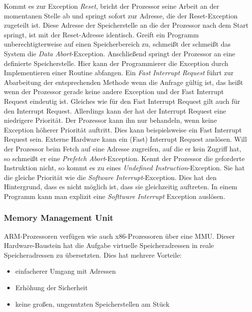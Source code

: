 Kommt es zur Exception \textit{Reset}, bricht der Prozessor seine Arbeit an der momentanen Stelle ab und springt sofort zur Adresse, die der Reset-Exception zugeteilt ist. Diese Adresse der Speicherstelle an die der Prozessor nach dem Start springt, ist mit der Reset-Adresse identisch. 
Greift ein Programm unberechtigterweise auf einen Speicherbereich zu, schmeißt der schmeißt das System die \textit{Data Abort}-Exception. Anschließend springt der Prozessor an eine definierte Speicherstelle. Hier kann der Programmierer die Exception durch Implementieren einer Routine abfangen. Ein \textit{Fast Interrupt Request} führt zur Abarbeitung der entsprechenden Methode wenn die Anfrage gültig ist, das heißt wenn der Prozessor gerade keine andere Exception und der Fast Interrupt Request eindeutig ist. Gleiches wie für den Fast Interrupt Request gilt auch für den Interrupt Request. Allerdings kann der hat der Interrupt Request eine niedrigere Priorität. Der Prozessor kann ihn nur behandeln, wenn keine Exception höherer Priorität auftritt. Dies kann beispielsweise ein Fast Interrupt Request sein. Externe Hardware kann ein (Fast) Interrupt Request auslösen. 
Will der Prozessor beim Fetch auf eine Adresse zugreifen, auf die er kein Zugriff hat, so schmeißt er eine \textit{Prefetch Abort}-Exception. Kennt der Prozessor die geforderte Instruktion nicht, so kommt es zu eines \textit{Undefined Instruction}-Exception. Sie hat die gleiche Priorität wie die \textit{Software Interrupt}-Exception. Dies hat den Hintergrund, dass es nicht möglich ist, dass sie gleichzeitig auftreten. In einem Programm kann man explizit eine \textit{Softtware Interrupt} Exception auslösen.    



\subsubsection{Memory Management Unit}
ARM-Prozessoren verfügen wie auch x86-Prozessoren über eine \ac{MMU}. Dieser Hardware-Baustein hat die Aufgabe virtuelle Speicheradressen in reale Speicheradressen zu übersetzten. Dies hat mehrere Vorteile: 
\begin{itemize}
\item einfacherer Umgang mit Adressen
\item Erhöhung der Sicherheit 
\item keine großen, ungenutzten Speicherstellen am Stück 
\end{itemize}

